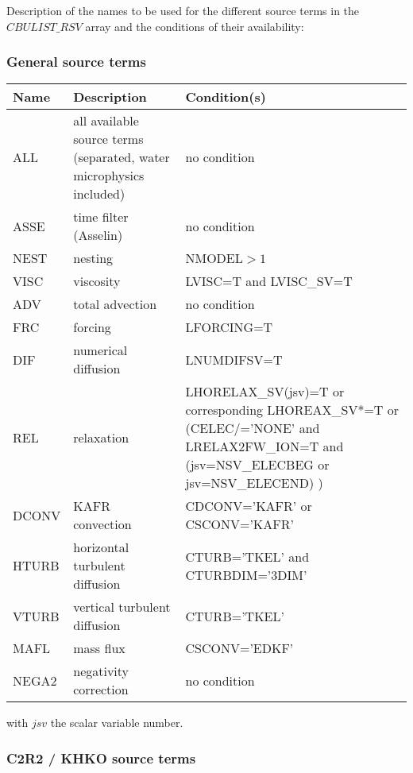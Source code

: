 Description of the names to be used for the different source terms in the $CBULIST\_RSV$ array and the conditions of their availability:

\subsubsection{General source terms}

\begin{longtable} {|p{}|p{}|p{}|}
\hline
Name & Description & Condition(s) \\
\hline \hline
\endhead
ALL    & all available source terms (separated,  water microphysics included) & no condition \\\hline \hline
ASSE   & time filter (Asselin)          & no condition                     \\\hline
NEST   & nesting                        & NMODEL$>1$                       \\\hline
VISC   & viscosity                      & LVISC=T and LVISC\_SV=T           \\\hline
ADV    & total advection                & no condition                     \\\hline
FRC    & forcing                        & LFORCING=T                       \\\hline
DIF    & numerical diffusion            & LNUMDIFSV=T                      \\\hline
REL    & relaxation                     & LHORELAX\_SV(jsv)=T or corresponding LHOREAX\_SV*=T or (CELEC/='NONE' and LRELAX2FW\_ION=T and (jsv=NSV\_ELECBEG or jsv=NSV\_ELECEND) ) \\\hline
DCONV  & KAFR convection                & CDCONV='KAFR' or CSCONV='KAFR'   \\\hline
HTURB  & horizontal turbulent diffusion & CTURB='TKEL' and CTURBDIM='3DIM' \\\hline
VTURB  & vertical turbulent diffusion   & CTURB='TKEL'                     \\\hline
MAFL   & mass flux                      & CSCONV='EDKF'                    \\\hline
NEGA2  & negativity correction          & no condition                     \\\hline
\end{longtable}

with $jsv$ the scalar variable number.

\subsubsection{C2R2 / KHKO source terms}

